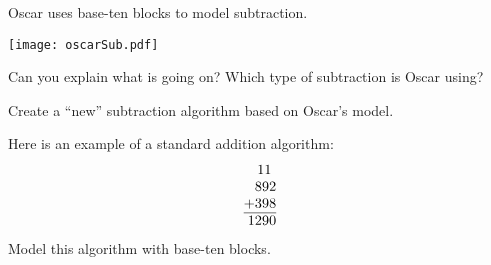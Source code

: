 \documentclass{ximera}
\begin{document}
\newpage
\begin{problem}
Oscar uses base-ten blocks to model subtraction.  
\begin{image}
\texttt{[image: oscarSub.pdf]}
\end{image}
Can you explain what is going on?  Which type of subtraction is Oscar using?  
\end{problem}

\begin{problem} Create a ``new'' subtraction algorithm based on Oscar's model.
\end{problem}

\newpage
\begin{problem}
Here is an example of a standard addition algorithm:
\[
\begin{tabular}{@{}r@{}}
11~~\\
892\\
+398\\ \hline
1290
\end{tabular}
\]
Model this algorithm with base-ten blocks.
\end{problem}
\end{document}
